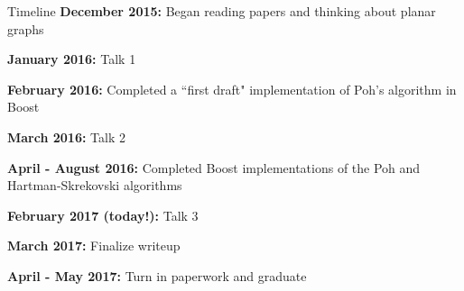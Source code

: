 \documentclass[pdf]{beamer}
\theoremstyle{definition}
\theoremstyle{definition}
\theoremstyle{definition}
\theoremstyle{definition}
\theoremstyle{definition}
\theoremstyle{definition}
\theoremstyle{definition}
\theoremstyle{definition}
\theoremstyle{definition}
\theoremstyle{definition}
\theoremstyle{definition}
\theoremstyle{definition}
\begin{document}
\begin{frame}{Timeline}
\textbf{December 2015:} Began reading papers and thinking about planar graphs

\textbf{January 2016:} Talk 1

\textbf{February 2016:} Completed a ``first draft" implementation of Poh's
algorithm in Boost

\textbf{March 2016:} Talk 2

\textbf{April - August 2016:} Completed Boost implementations of the Poh
and Hartman-Skrekovski algorithms

\textbf{February 2017 (today!):} Talk 3 

\textbf{March 2017:} Finalize writeup

\textbf{April - May 2017:} Turn in paperwork and graduate
\end{frame}
\end{document}
